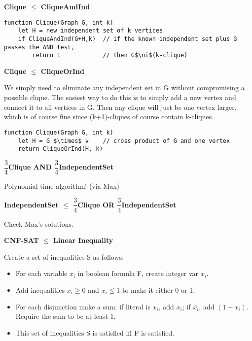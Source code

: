 \documentclass[12pt]{article}
\providecommand{\reducible}[2]{
  \textbf{#1} $\leq$ \textbf{#2}
}
\begin{document}
\begin{centering}\textbf{\reducible{Clique}{CliqueAndInd}}\par\end{centering}
\begin{lstlisting}
function Clique(Graph G, int k)
    let H = new independent set of k vertices
    if CliqueAndInd(G+H,k)  // if the known independent set plus G passes the AND test,
        return 1            // then G$\ni$(k-clique)
\end{lstlisting}


\begin{centering}\textbf{\reducible{Clique}{CliqueOrInd}}\par\end{centering}
We simply need to eliminate any independent set in G without compromising a possible clique.
The easiest way to do this is to simply add a new vertex and connect it to all vertices in G.
Then any clique will just be one vertex larger, which is of course fine since (k+1)-cliques of course contain k-cliques.
\begin{lstlisting}
function Clique(Graph G, int k)
    let H = G $\times$ v    // cross product of G and one vertex
    return CliqueOrInd(H, k)
\end{lstlisting}


\begin{centering}\textbf{$\dfrac{3}{4}$Clique AND $\dfrac{3}{4}$IndependentSet}\par\end{centering}
Polynomial time algorithm! (via Max)

\begin{centering}\textbf{\reducible{IndependentSet}{$\dfrac{3}{4}$Clique OR $\dfrac{3}{4}$IndependentSet}}\par\end{centering}
Check Max's solutions.

\begin{centering}\textbf{\reducible{CNF-SAT}{Linear Inequality}}\par\end{centering}
Create a set of inequalities S as follows:\\
\begin{itemize}
  \item For each variable $x_i$ in boolean formula F, create integer var $x_i$.
  \item Add inequalities $x_i \geq 0$ and $x_i \leq 1$ to make it either 0 or 1.
  \item For each disjunction make a sum: if literal is $x_i$, add $x_i$; if $\overline{x_i}$, add $(1-x_i)$. Require the sum to be at least 1.
  \item This set of inequalities S is satisfied iff F is satisfied.
\end{itemize}
\end{document}
